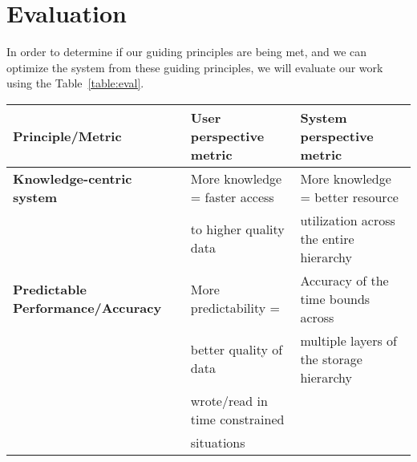 \section{Evaluation}
\label{sec:evaluation}
In order to determine if our guiding principles are being met, and we can optimize the system from these guiding principles, 
we will evaluate our work using the Table~\ref{table:eval}.


\begin{tabular}{ | l | l | l | }

\hline
	{\bf Principle/Metric}                   & {\bf User perspective metric}                     & {\bf System perspective metric }\\ \hline
	{\bf Knowledge-centric system} & More knowledge = faster access            &  More knowledge = better resource\\
                                                               &    to higher quality data                               &    utilization across the entire hierarchy \\ \hline
                                                                                                                                        
                                                                                                                                         
                                                                                                                                             
        {\bf Predictable Performance/Accuracy} & More predictability =                     &  Accuracy of the time bounds across \\
                                                                             & better quality of data                      &  multiple layers of the storage hierarchy \\ 
                                                                             & wrote/read in time constrained\\
                                                                             & situations \\ \hline
                                                                                                                                         
                                                                                                                                            
\end{tabular}

